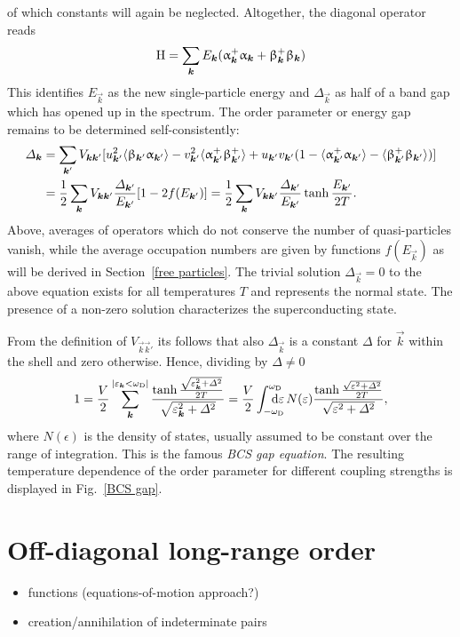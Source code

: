 %
of which constants will again be neglected. Altogether, the diagonal
 operator reads
%
\begin{equation*}
    \mathrm H =
    \sum_{\boldsymbol k} E_{\boldsymbol k}
        ( \upalpha_{\boldsymbol k}^+ \upalpha_{\boldsymbol k}
        + \upbeta_{\boldsymbol k}^+ \upbeta_{\boldsymbol k} )
\end{equation*}
%
This identifies $E_{\vec k}$ as the new single-particle energy and $\Delta_{\vec
k}$ as half of a band gap which has opened up in the spectrum. The order
parameter or energy gap remains to be determined self-consistently:
%
\begin{align*}
    \varDelta_{\boldsymbol k} &= \sum_{\boldsymbol k'} V_{\boldsymbol k \boldsymbol k'} [
        u_{\boldsymbol k'}^2 \langle\upbeta_{\boldsymbol k'} \upalpha_{\boldsymbol k'}\rangle
        - v_{\boldsymbol k'}^2 \langle\upalpha_{\boldsymbol k'}^+ \upbeta_{\boldsymbol k'}^+\rangle
        + u_{\boldsymbol k'} v_{\boldsymbol k'} (
            1 - \langle\upalpha_{\boldsymbol k'}^+ \upalpha_{\boldsymbol k'}\rangle
            - \langle\upbeta_{\boldsymbol k'}^+ \upbeta_{\boldsymbol k'}\rangle
            )
        ]
    \\
    &= \frac 1 2 \sum_{\boldsymbol k} V_{\boldsymbol k \boldsymbol k'}
    \frac{\varDelta_{\boldsymbol k'}}{E_{\boldsymbol k'}} [1 - 2 f(E_{\boldsymbol k'})]
    = \frac 1 2 \sum_{\boldsymbol k} V_{\boldsymbol k \boldsymbol k'}
    \frac{\varDelta_{\boldsymbol k'}}{E_{\boldsymbol k'}} \tanh \frac{E_{\boldsymbol k'}}{2 T}.
\end{align*}
%
Above, averages of operators which do not conserve the number of
 quasi-particles vanish, while the average occupation numbers
are given by  functions $f(E_{\vec k})$ as will be derived in
Section~\ref{free particles}. The trivial solution $\Delta_{\vec k} = 0$ to the
above equation exists for all temperatures $T$ and represents the normal state.
The presence of a non-zero solution characterizes the superconducting state.

From the definition of $V_{\vec k \vec k'}$ its follows that also $\Delta_{\vec
k}$ is a constant $\Delta$ for $\vec k$ within the  shell and zero
otherwise. Hence, dividing by $\Delta \neq 0$
%
\begin{equation*}
    1 = \frac V 2
    \sum_{\vec k}^{|\epsilon_{\vec k} < \omega \sub D|}
    \frac
        {\tanh \frac{\sqrt{\epsilon_{\vec k}^2 + \Delta^2}}{2 T}}
        {\sqrt{\epsilon_{\vec k}^2 + \Delta^2}}
    = \frac V 2 \int \from{-\omega \sub D} \till{\omega \sub D} \D \epsilon \,
    N(\epsilon) \frac
        {\tanh \frac{\sqrt{\epsilon^2 + \Delta^2}}{2 T}}
        {\sqrt{\epsilon^2 + \Delta^2}},
\end{equation*}
%
where $N(\epsilon)$ is the density of states, usually assumed to be constant
over the range of integration. This is the famous \emph{BCS gap equation}. The
resulting temperature dependence of the order parameter for different coupling
strengths is displayed in Fig.~\ref{BCS gap}.

\section{Off-diagonal long-range order}

\begin{itemize}
    \item {} functions (equations-of-motion approach?)
    \item creation/annihilation of indeterminate  pairs
\end{itemize}
